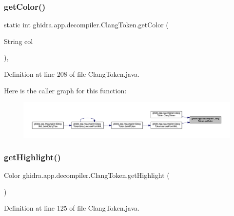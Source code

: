 \subsubsection{\texorpdfstring{getColor()}{getColor()}}
{\footnotesize\ttfamily static int ghidra.\+app.\+decompiler.\+Clang\+Token.\+get\+Color (\begin{DoxyParamCaption}\item[{String}]{col }\end{DoxyParamCaption})\hspace{0.3cm}{\ttfamily [inline]}, {\ttfamily [static]}}



Definition at line 208 of file Clang\+Token.\+java.

Here is the caller graph for this function\+:
\nopagebreak
\begin{figure}[H]
\begin{center}
\leavevmode
\includegraphics[width=350pt]{classghidra_1_1app_1_1decompiler_1_1_clang_token_aacea75ea4da0a1ed20b8034c5805b8d4_icgraph}
\end{center}
\end{figure}
\mbox{\label{classghidra_1_1app_1_1decompiler_1_1_clang_token_a9732960b1a55039d9230bf14081cc8bc}} 
\subsubsection{\texorpdfstring{getHighlight()}{getHighlight()}}
{\footnotesize\ttfamily Color ghidra.\+app.\+decompiler.\+Clang\+Token.\+get\+Highlight (\begin{DoxyParamCaption}{ }\end{DoxyParamCaption})\hspace{0.3cm}{\ttfamily [inline]}}



Definition at line 125 of file Clang\+Token.\+java.

